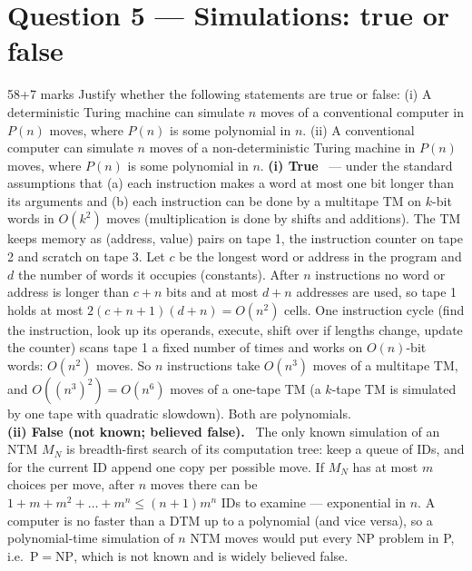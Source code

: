 \documentclass[10.5pt,a4paper]{article}
\newcommand{\ansh}[1]{\textbf{\color{exborder}#1}\ }
\newcommand{\NP}{\mathrm{NP}}
\renewcommand{\P}{\mathrm{P}}
\begin{document}
\section{Question 5 --- Simulations: true or false}
\begin{qa}{5}{8+7 marks}
Justify whether the following statements are true or false: (i) A deterministic Turing machine can simulate $n$ moves of a conventional computer
in $P(n)$ moves, where $P(n)$ is some polynomial in $n$. (ii) A conventional computer can simulate $n$ moves of a non-deterministic Turing machine
in $P(n)$ moves, where $P(n)$ is some polynomial in $n$.
\tcblower
\ansh{(i) True} --- under the standard assumptions that (a) each instruction makes a word at most one bit longer than its arguments and (b) each
instruction can be done by a multitape TM on $k$-bit words in $O(k^2)$ moves (multiplication is done by shifts and additions).
The TM keeps memory as (address, value) pairs on tape 1, the instruction counter on tape 2 and scratch on tape 3. Let $c$ be the longest word or
address in the program and $d$ the number of words it occupies (constants). After $n$ instructions no word or address is longer than $c+n$ bits
and at most $d+n$ addresses are used, so tape 1 holds at most $2(c+n+1)(d+n)=O(n^2)$ cells. One instruction cycle (find the instruction,
look up its operands, execute, shift over if lengths change, update the counter) scans tape 1 a fixed number of times and works on $O(n)$-bit
words: $O(n^2)$ moves. So $n$ instructions take $O(n^3)$ moves of a multitape TM, and $O((n^3)^2)=O(n^6)$ moves of a one-tape TM (a $k$-tape TM
is simulated by one tape with quadratic slowdown). Both are polynomials.\\[3pt]
\ansh{(ii) False (not known; believed false).} The only known simulation of an NTM $M_N$ is breadth-first search of its computation tree: keep a
queue of IDs, and for the current ID append one copy per possible move. If $M_N$ has at most $m$ choices per move, after $n$ moves there can be
$1+m+m^2+\dots+m^n\le(n+1)m^n$ IDs to examine --- exponential in $n$. A computer is no faster than a DTM up to a polynomial (and vice versa), so a
polynomial-time simulation of $n$ NTM moves would put every NP problem in P, i.e.\ $\P=\NP$, which is not known and is widely believed false.
\end{qa}
\end{document}
